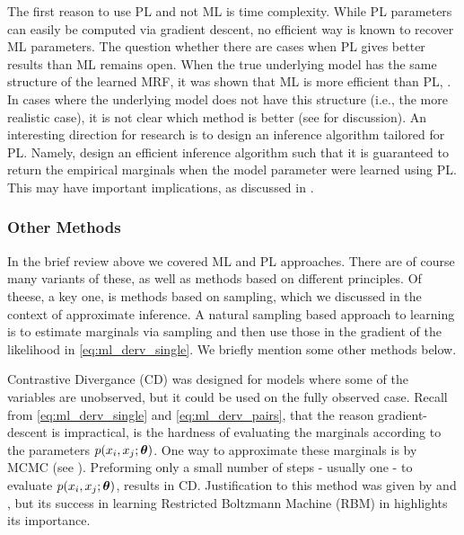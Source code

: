 The first reason to use PL and not ML is time complexity.
While PL parameters can easily be computed via gradient descent, no efficient way is known to recover ML parameters.
The question whether there are cases when PL gives better results than ML remains open.
When the true underlying model has the same structure of the learned MRF, it was shown that ML is more efficient than PL, \cite{liang2008asymptotic}.
In cases where the underlying model does not have this structure (i.e., the more realistic case), it is not clear which method is better (see \cite{varin2011overview} for discussion).
An interesting direction for research is to design an inference algorithm tailored for PL.
Namely, design an efficient inference algorithm such that it is guaranteed to return the empirical marginals when the model parameter were learned using PL.
This may have important implications, as discussed in .

\subsubsection{Other Methods}
In the brief review above we covered ML and PL approaches. There are of course 
many variants of these, as well as methods based on different principles. Of theese, a key one, is methods based on sampling, which we discussed in the context of approximate inference. A natural sampling based approach to learning is to estimate marginals via sampling and then use those in the gradient of the likelihood in \eqref{eq:ml_derv_single}. We briefly mention some other methods below.
 
Contrastive Divergance (CD) \cite{hinton2002training} was designed for models where some of the variables are unobserved, but it could be used on the fully observed case. Recall from \eqref{eq:ml_derv_single} and \eqref{eq:ml_derv_pairs}, that the reason gradient-descent is impractical,  is the hardness of evaluating the marginals according to the parameters $p(x_i,x_j;\boldsymbol{\theta})$. 
One way to approximate these marginals is by MCMC (see ).
Preforming only a small number of steps - usually one - to evaluate $p(x_i,x_j;\boldsymbol{\theta})$, results in CD. Justification to this method was given by \cite{bengio2009justifying} and \cite{carreira2005contrastive}, but its success in learning Restricted Boltzmann Machine (RBM) in highlights its importance.

